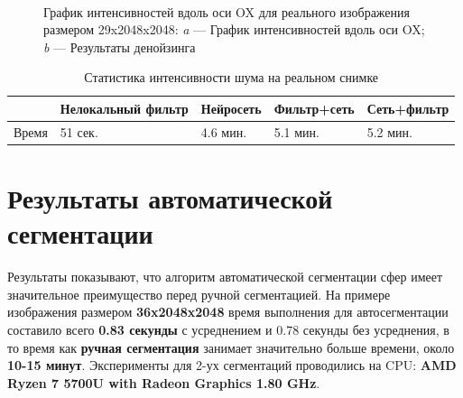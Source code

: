 \begin{figure}[H]
\begin{subfigure}[t]{0.3\textwidth\relax}
	\end{subfigure}
	\\[20pt]
	\captionsetup{justification=centering} %
	\caption{График интенсивностей вдоль оси OX для реального изображения размером 29x2048x2048: {\itshape a} --- График интенсивностей вдоль оси OX; {\itshape b} --- Результаты денойзинга} 
	\label{fig:intensity-test2}
\end{figure}
\begin{table} [H]%
	\centering\small
	\caption{Статистика интенсивности шума на реальном снимке}%
	\label{tab:intensity-test2}		
	\begin{tabular}{|l|l|l|l|l|}
		\hline
		&Нелокальный фильтр&Нейросеть&Фильтр+сеть&Сеть+фильтр\\
		\hline	
		Время
		&51 сек.&4.6 мин.&5.1 мин.&5.2 мин.\\ \hline
	\end{tabular}
	\normalsize%
\end{table}

\section{Результаты автоматической сегментации}
\par Результаты показывают, что алгоритм автоматической сегментации сфер имеет значительное преимущество перед ручной сегментацией. На примере изображения размером \textbf{36x2048x2048} время выполнения для автосегментации составило всего \textbf{0.83 секунды} с усреднением и 0.78 секунды без усреднения, в то время как \textbf{ручная сегментация} занимает значительно больше времени, около \textbf{10-15 минут}. Эксперименты для 2-ух сегментаций проводились на CPU: \textbf{AMD Ryzen 7 5700U with Radeon Graphics 1.80 GHz}.

